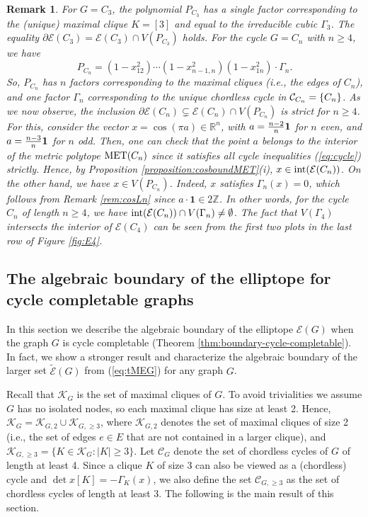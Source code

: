 \documentclass[a4paper, 11pt, twoside]{article}
\newcommand{\R}{\mathbb{R}}
\newcommand{\ME}{{\mathcal E}}
\newcommand{\MET}{\text{\rm MET}}
\newcommand{\MK}{{\mathcal K}}
\newcommand{\MC}{{\mathcal C}}
\newcommand{\Z}{\mathbb Z}
\newcommand{\one}{{\mathbf 1}}
\newcommand{\tME}{\widetilde \ME}
\theoremstyle{plain}
\newtheorem{remark}[theorem]{Remark}
\begin{document}
\begin{remark}\label{rem:strictinclusion}
 For $G=C_3$,  the polynomial $P_{C_3}$ has a single factor corresponding to the (unique) maximal clique $K = [3]$ and  equal to the irreducible cubic $\Gamma_3$. The equality $\partial \ME(C_3)=\ME(C_3)\cap V(P_{C_3})$ holds. For the cycle $G=C_n$ with  $n\ge 4$, we have
\[
    P_{C_n} = (1-x_{12}^2) \cdots (1-x_{n-1,n}^2)(1-x_{1n}^2) \cdot \Gamma_n.
\]
So, $P_{C_n}$ has  $n$ factors corresponding to the maximal cliques (i.e., the edges of $C_n$), and one factor $\Gamma_n$ corresponding to the unique chordless cycle in ${\cal C}_{C_n} = \{C_n\}$.
As we now observe, the inclusion  $\partial \ME(C_n)\subsetneq \ME(C_n)\cap V(P_{C_n})$ is strict for $n\ge 4$. For this, consider the vector 
$x=\cos(\pi a)\in \R^n$, with  $a={n-2\over n}\one $ for $n$  even, and $a={n-3\over n}\one $ for $n$  odd. Then, one can check that the point $a$ belongs to the interior of the metric polytope $\MET(C_n)$ since it satisfies all cycle inequalities (\ref{eq:cycle}) strictly. Hence, by Proposition \ref{proposition:cosboundMET}(i), $x\in {\rm int}(\ME(C_n))$. On the other hand, we have $x\in V(P_{C_n})$. Indeed, $x$ satisfies $\Gamma_n(x)=0$, which follows from 
Remark \ref{rem:cosLn}  
since $a\cdot \one \in 2\Z$. In other words, for the cycle $C_n$ of length $n\ge 4$, we have 
$\text{\rm int}(\ME(C_n)) \cap V(\Gamma_n)\ne \emptyset$.
The fact that $V(\Gamma_4)$ intersects the interior of $\ME(C_4)$ can be seen from the first two plots in the last row of Figure \ref{fig:E4}.
\end{remark}




\subsection{The algebraic boundary of the elliptope for cycle completable graphs}
\label{sec:boundary-cycle-completable}

In this section we describe the algebraic boundary of the elliptope $\ME(G)$ when the graph $G$ is cycle completable (Theorem \ref{thm:boundary-cycle-completable}). In fact, we show a stronger result and characterize the algebraic boundary of the larger set $\tME(G)$ from (\ref{eq:tMEG}) for any graph $G$.


Recall that 
$\MK_G$ is the set of maximal cliques of $G$. To avoid trivialities we assume  $G$ has no isolated nodes, so   each maximal clique has size at least 2.  
Hence, $\MK_G=\MK_{G,2}\cup\MK_{G,\ge 3}$, where $\MK_{G,2}$ denotes the set of maximal cliques of size 2 (i.e., the set of edges $e\in E$ that are not contained in a larger clique), and $\MK_{G,\ge 3}=\{K\in \MK_G: |K|\ge 3\}$.
Let $\MC_G$ denote the set of  chordless cycles of $G$ of length at least 4. Since a clique $K$  of size 3 can also be viewed as a (chordless) cycle and $\det x[K]=-\Gamma_K(x)$, we also define the set 
$\MC_{G,\ge 3}$ as the set of chordless cycles of length at least 3. 
The following is the main result of this section.
\end{document}
